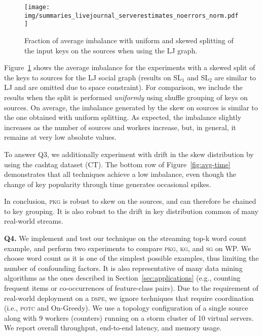 \documentclass[10pt,conference,letterpaper]{IEEEtran}
\newcommand{\spara}[1]{\smallskip\noindent\textbf{#1}}
\newcommand{\potc}{\textsc{p\textup{o}tc}\xspace}
\newcommand{\dspe}{\textsc{dspe}\xspace}
\newcommand{\pkgs}{\textsc{pkg}\xspace}
\newcommand{\kg}{\textsc{kg}\xspace}
\newcommand{\sg}{\textsc{sg}\xspace}
\begin{document}
\begin{figure}[t]
\begin{center}
	\texttt{[image: img/summaries\_livejournal\_serverestimates\_noerrors\_norm.pdf]}
	\caption{Fraction of average imbalance with uniform and skewed splitting of the input keys on the sources when using the LJ graph.}
	\label{fig:avg-skewed-shuffled}
\end{center}
\end{figure}

Figure~\ref{fig:avg-skewed-shuffled} shows the average imbalance for the experiments with a skewed split of the keys to sources for the LJ social graph (results on SL$_1$ and SL$_2$ are similar to LJ and are omitted due to space constraint).
For comparison, we include the results when the split is performed \emph{uniformly} using shuffle grouping of keys on sources.
On average, the imbalance generated by the skew on sources is similar to the one obtained with uniform splitting.
As expected, the imbalance slightly increases as the number of sources and workers increase, but, 
in general, it remains at very low absolute values.

To answer Q3, we additionally experiment with drift in the skew distribution by using the cashtag dataset (CT).
The bottom row of Figure~\ref{fig:avg-time} demonstrates that all techniques achieve a low imbalance, even though the change of key popularity through time generates occasional spikes.


In conclusion, \pkgs is robust to skew on the sources, and can therefore be chained to key grouping.
It is also robust to the drift in key distribution common of many real-world streams.



\enlargethispage{\baselineskip}

\spara{Q4.}
We implement and test our technique on the streaming top-k word count example, and perform two experiments to compare \pkgs, \kg, and \sg on WP.
We choose word count as it is one of the simplest possible examples, thus limiting the number of confounding factors.
It is also representative of many data mining algorithms as the ones described in Section~\ref{sec:applications} (e.g., counting frequent items or co-occurrences of feature-class pairs).
Due to the requirement of real-world deployment on a \dspe, we ignore techniques that require coordination (i.e., \potc and On-Greedy).
We use a topology configuration of a single source along with 9 workers (counters) running on a storm cluster of 10 virtual servers. We report overall throughput, end-to-end latency, and memory usage. 
\end{document}
